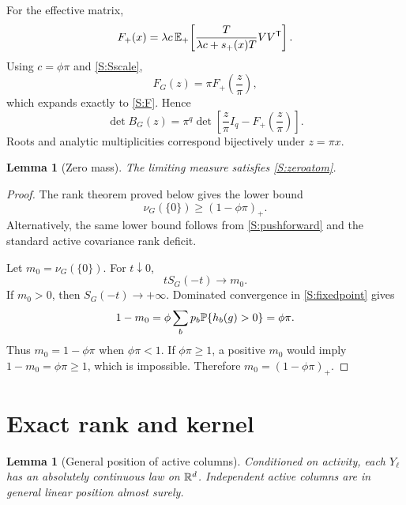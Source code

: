 \documentclass[
  aps,
  prl,
  10pt,
  onecolumn,
  longbibliography,
  nofootinbib
]{revtex4-2}
\newtheorem{lemma}[theorem]{Lemma}
\theoremstyle{remark}
\begin{document}
For the effective matrix,
\begin{equation}
F_+(x)=
\lambda c\,\mathbb{E}_+\!\left[
\frac{T}{\lambda c+s_+(x)T}VV^{\mathsf T}
\right].
\end{equation}
Using $c=\phi\pi$ and \eqref{S:Sscale},
\begin{equation}
F_G(z)=\pi F_+\!\left(\frac z\pi\right),
\label{S:Fscale}
\end{equation}
which expands exactly to \eqref{S:F}. Hence
\begin{equation}
\det B_G(z)
=
\pi^q\det\!\left[
\frac z\pi I_q-F_+\!\left(\frac z\pi\right)
\right].
\label{S:detscale}
\end{equation}
Roots and analytic multiplicities correspond bijectively under $z=\pi x$.

\begin{lemma}[Zero mass]
The limiting measure satisfies \eqref{S:zeroatom}.
\end{lemma}

\begin{proof}
The rank theorem proved below gives the lower bound
\begin{equation}
\nu_G(\{0\})\ge(1-\phi\pi)_+.
\end{equation}
Alternatively, the same lower bound follows from \eqref{S:pushforward} and the standard active covariance rank deficit.

Let $m_0=\nu_G(\{0\})$. For $t\downarrow0$,
\begin{equation}
tS_G(-t)\longrightarrow m_0.
\end{equation}
If $m_0>0$, then $S_G(-t)\to+\infty$. Dominated convergence in \eqref{S:fixedpoint} gives
\begin{equation}
1-m_0=\phi\sum_bp_b\mathbb{P}\{h_b(g)>0\}=\phi\pi.
\end{equation}
Thus $m_0=1-\phi\pi$ when $\phi\pi<1$. If $\phi\pi\ge1$, a positive $m_0$ would imply $1-m_0=\phi\pi\ge1$, which is impossible. Therefore $m_0=(1-\phi\pi)_+$.
\end{proof}

\section{Exact rank and kernel}

\begin{lemma}[General position of active columns]
Conditioned on activity, each $Y_\ell$ has an absolutely continuous law on $\mathbb{R}^d$. Independent active columns are in general linear position almost surely.
\end{lemma}
\end{document}
